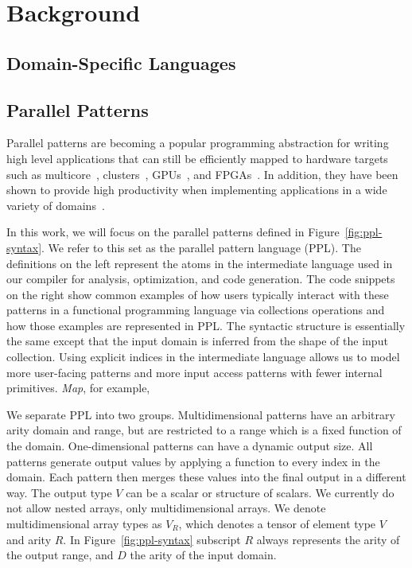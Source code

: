 \chapter{Background}
\label{background}

\section{Domain-Specific Languages}


\section{Parallel Patterns}



Parallel patterns are becoming a popular programming abstraction for writing
high level applications that can still be efficiently mapped to hardware
targets such as multicore~\cite{scala,haskell,delite-tecs14},
clusters~\cite{mapreduce,zaharia10spark,spartan},
GPUs~\cite{catanzaro11copperhead,micro14lee},
and FPGAs~\cite{auerbach10lime,george14fpl}. In addition, they have been shown
to provide high productivity when implementing applications in a wide variety
of domains~\cite{ecoop13sujeeth,pldi13halide}.

In this work, we will focus on the parallel patterns defined in Figure~\ref{fig:ppl-syntax}.
We refer to this set as the parallel pattern language (PPL).
The definitions on the left represent the atoms in the intermediate language
used in our compiler for analysis, optimization, and code generation. The code
snippets on the right show common examples of how users typically interact with
these patterns in a functional programming language via collections operations
and how those examples are represented in PPL. The syntactic structure is
essentially the same except that the input domain is inferred from the shape of
the input collection. Using explicit indices in the intermediate language allows
us to model more user-facing patterns and more input access patterns with fewer internal primitives.
\emph{Map}, for example,

We separate PPL into two groups. Multidimensional patterns
have an arbitrary arity domain and range, but are restricted to a range which
is a fixed function of the domain. One-dimensional patterns can have a dynamic
output size. All patterns generate output values by applying a function to
every index in the domain. Each pattern then merges these values into the final
output in a different way. The output type $V$ can be a scalar or structure of
scalars. We currently do not allow nested arrays, only multidimensional arrays.
We denote multidimensional array types as $V_R$, which denotes a tensor of
element type $V$ and arity $R$. In Figure~\ref{fig:ppl-syntax} subscript $R$
always represents the arity of the output range, and $D$ the arity of the input domain.


